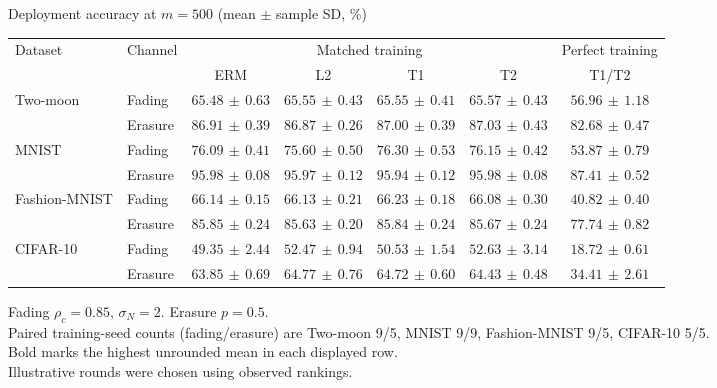 \documentclass[border=4pt]{standalone}
\begin{document}
\begin{minipage}{7.8in}
\centering
Deployment accuracy at $m=500$ (mean $\pm$ sample SD, \%)\\[4pt]
\begin{tabular*}{\linewidth}{@{\extracolsep{\fill}}llccccc@{}}
\toprule
\multirow{2}{*}{Dataset} & \multirow{2}{*}{Channel} & \multicolumn{4}{c}{Matched training} & Perfect training \\
\cmidrule(lr){3-6}\cmidrule(l){7-7}
 & & ERM & L2 & T1 & T2 & T1/T2 \\
\midrule
\multirow{2}{*}{Two-moon} & Fading & $65.48\,\pm\,0.63$ & $65.55\,\pm\,0.43$ & $65.55\,\pm\,0.41$ & $\mathbf{65.57}\,\pm\,0.43$ & $56.96\,\pm\,1.18$ \\
 & Erasure & $86.91\,\pm\,0.39$ & $86.87\,\pm\,0.26$ & $87.00\,\pm\,0.39$ & $\mathbf{87.03}\,\pm\,0.43$ & $82.68\,\pm\,0.47$ \\
\midrule[0.25pt]
\multirow{2}{*}{MNIST} & Fading & $76.09\,\pm\,0.41$ & $75.60\,\pm\,0.50$ & $\mathbf{76.30}\,\pm\,0.53$ & $76.15\,\pm\,0.42$ & $53.87\,\pm\,0.79$ \\
 & Erasure & $95.98\,\pm\,0.08$ & $95.97\,\pm\,0.12$ & $95.94\,\pm\,0.12$ & $\mathbf{95.98}\,\pm\,0.08$ & $87.41\,\pm\,0.52$ \\
\midrule[0.25pt]
\multirow{2}{*}{Fashion-MNIST} & Fading & $66.14\,\pm\,0.15$ & $66.13\,\pm\,0.21$ & $\mathbf{66.23}\,\pm\,0.18$ & $66.08\,\pm\,0.30$ & $40.82\,\pm\,0.40$ \\
 & Erasure & $\mathbf{85.85}\,\pm\,0.24$ & $85.63\,\pm\,0.20$ & $85.84\,\pm\,0.24$ & $85.67\,\pm\,0.24$ & $77.74\,\pm\,0.82$ \\
\midrule[0.25pt]
\multirow{2}{*}{CIFAR-10} & Fading & $49.35\,\pm\,2.44$ & $52.47\,\pm\,0.94$ & $50.53\,\pm\,1.54$ & $\mathbf{52.63}\,\pm\,3.14$ & $18.72\,\pm\,0.61$ \\
 & Erasure & $63.85\,\pm\,0.69$ & $\mathbf{64.77}\,\pm\,0.76$ & $64.72\,\pm\,0.60$ & $64.43\,\pm\,0.48$ & $34.41\,\pm\,2.61$ \\
\bottomrule
\end{tabular*}
\par\smallskip\raggedright\footnotesize
Fading $\rho_c=0.85$, $\sigma_N=2$. Erasure $p=0.5$.\\
Paired training-seed counts (fading/erasure) are Two-moon 9/5, MNIST 9/9, Fashion-MNIST 9/5, CIFAR-10 5/5.\\
Bold marks the highest unrounded mean in each displayed row.\\
Illustrative rounds were chosen using observed rankings.
\end{minipage}
\end{document}
